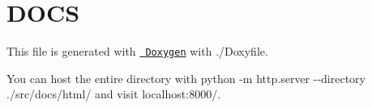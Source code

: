 \chapter{DOCS}
\hypertarget{md_readme}{}\label{md_readme}
\label{md_readme_autotoc_md0}%
%
 This file is generated with \href{https://www.doxygen.nl/}{\texttt{ Doxygen}} with {\ttfamily ./\+Doxyfile}.

You can host the entire directory with {\ttfamily python -\/m http.\+server -\/-\/directory ./src/docs/html/} and visit {\ttfamily localhost\+:8000/}. 